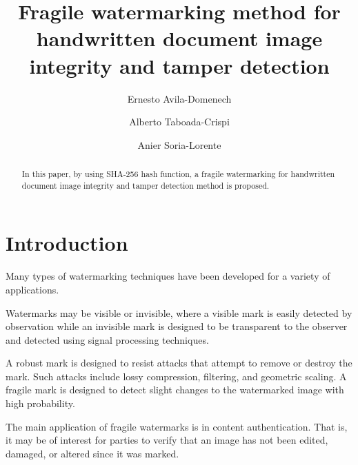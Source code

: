 \documentclass[runningheads]{llncs}
\begin{document}
%
\title{Fragile watermarking method for handwritten document image integrity and tamper detection}
%
%
\author{Ernesto Avila-Domenech \and
Alberto Taboada-Crispi \and
Anier Soria-Lorente}
%
%
%
\maketitle              %
%
\begin{abstract}
In this paper, by using SHA-256 hash function, a fragile watermarking for handwritten document image integrity and tamper detection method is proposed.

\end{abstract}
%
%
%
\section{Introduction}
Many types of watermarking techniques have been developed for a variety of applications.

Watermarks may be visible or invisible, where a visible mark is easily detected by observation while an invisible mark is designed to be transparent to the observer and detected using signal processing techniques.

A robust mark is designed to resist attacks that attempt to remove or destroy the mark. Such attacks include lossy compression, filtering, and geometric scaling. A fragile mark is designed to detect slight changes to the watermarked image with high probability.

The main application of fragile watermarks is in content authentication. That is, it may be of interest for parties to verify that an image has not been edited, damaged, or altered since it was marked.
\end{document}
